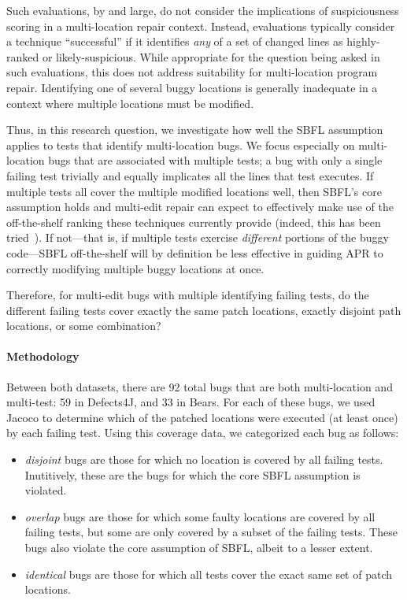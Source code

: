 Such evaluations, by and large, do not consider the implications of
suspiciousness scoring in a multi-location repair context.  Instead, evaluations
typically consider a technique ``successful'' if it identifies \emph{any} of a
set of changed lines as highly-ranked or likely-suspicious.  While appropriate
for the question being asked in such evaluations, this does not address
suitability for multi-location program repair.  Identifying one of several buggy
locations is generally inadequate in a context where multiple locations must be
modified.  

Thus, in this research question, we investigate how well the SBFL assumption
applies to tests that identify multi-location bugs. We focus especially on
multi-location bugs that are associated with multiple tests; a bug with only a single failing 
test 
trivially and equally implicates all the lines that test executes.  If multiple tests all cover the 
multiple
modified locations well, then SBFL's core assumption holds and multi-edit repair
can expect to effectively make use of the off-the-shelf ranking these techniques
currently provide (indeed, this has been tried~\cite{angelix}). If not---that
is, if multiple tests exercise \emph{different} portions of the buggy
code---SBFL off-the-shelf will by definition be less effective in guiding APR to
correctly modifying multiple buggy locations at once.

Therefore, for multi-edit bugs with multiple identifying failing tests, do the 
different failing tests cover exactly the same patch locations, exactly 
disjoint path locations, or some combination?



\paragraph{Methodology}

Between both datasets, there are 92 total bugs that are both multi-location and 
multi-test: 59 in Defects4J, and 33 in Bears.  For each of these bugs, we used 
Jacoco to determine which of the patched locations were executed (at
least once) by each failing test. Using 
this coverage data, we categorized each bug as follows:
\begin{itemize}
\item \emph{disjoint} bugs are those for which no location is covered by all
failing tests.  Inutitively, these are the bugs for which the core SBFL
assumption is violated.
\item \emph{overlap} bugs are those for which some faulty locations are covered by
all failing tests, but some are only covered by a subset of the failing tests. These bugs also 
violate the core assumption of SBFL, albeit to a lesser extent.
\item \emph{identical} bugs are those for which all tests cover the exact same set of
  patch locations.
\end{itemize}


